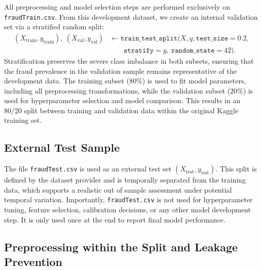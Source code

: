 \documentclass[oneside,12pt,parskip=half,american,numbers=noenddot]{scrreprt}
\begin{document}
All preprocessing and model selection steps are performed exclusively on \texttt{fraudTrain.csv}. From this development dataset, we create an internal validation set via a stratified random split:
\[
\begin{aligned}
(X_{\text{train}}, y_{\text{train}}),\ (X_{\text{val}}, y_{\text{val}})
&\leftarrow \texttt{train\_test\_split}(X, y, \texttt{test\_size}=0.2, \\
&\qquad\texttt{stratify}=y,\ \texttt{random\_state}=42).
\end{aligned}
\]
Stratification preserves the severe class imbalance in both subsets, ensuring that the fraud prevalence in the validation sample remains representative of the development data. The training subset (\(80\%\)) is used to fit model parameters, including all preprocessing transformations, while the validation subset (\(20\%\)) is used for hyperparameter selection and model comparison. This results in an 80/20 split between training and validation data within the original Kaggle training set.

\subsection{External Test Sample}

The file \texttt{fraudTest.csv} is used as an external test set \((X_{\text{test}}, y_{\text{test}})\). This split is defined by the dataset provider and is temporally separated from the training data, which supports a realistic out of sample assessment under potential temporal variation. Importantly, \texttt{fraudTest.csv} is not used for hyperparameter tuning, feature selection, calibration decisions, or any other model development step. It is only used once at the end to report final model performance.

\subsection{Preprocessing within the Split and Leakage Prevention}
\end{document}
